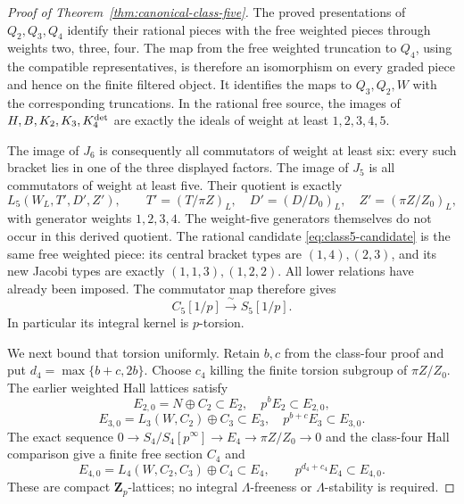 \begin{proof}[Proof of Theorem~\ref{thm:canonical-class-five}]
The proved presentations of $Q_2,Q_3,Q_4$ identify
their rational pieces with the free weighted pieces
through weights two, three, four. The map from the
free weighted truncation to $Q_4$, using the compatible
representatives, is therefore an isomorphism on every
graded piece and hence on the finite filtered object.
It identifies the maps to $Q_3,Q_2,W$ with the
corresponding truncations. In the rational free source,
the images of $H,B,K_2,K_3,K_4^{\rm det}$ are exactly
the ideals of weight at least $1,2,3,4,5$.

The image of $J_6$ is consequently all commutators of
weight at least six: every such bracket lies in one
of the three displayed factors. The image of $J_5$
is all commutators of weight at least five. Their
quotient is exactly
\[
 L_5(W_L,T',D',Z'),\qquad
 T'=(T/\pi Z)_L,\quad D'=(D/D_0)_L,\quad
 Z'=(\pi Z/Z_0)_L,
\]
with generator weights $1,2,3,4$.
The weight-five generators themselves do not occur
in this derived quotient. The rational candidate
\eqref{eq:class5-candidate} is the same free weighted
piece: its central bracket types are $(1,4),(2,3)$,
and its new Jacobi types are exactly $(1,1,3),(1,2,2)$.
All lower relations have already been imposed.
The commutator map therefore gives
\begin{equation}\label{eq:class5-rational-source}
              C_5[1/p]\xrightarrow{\ \sim\ }S_5[1/p].
\end{equation}
In particular its integral kernel is $p$-torsion.

We next bound that torsion uniformly. Retain $b,c$
from the class-four proof and put
$d_4=\max\{b+c,2b\}$. Choose $c_4$ killing the finite
torsion subgroup of $\pi Z/Z_0$. The earlier weighted
Hall lattices satisfy
\[
 E_{2,0}=N\oplus C_2\subset E_2,\quad p^bE_2\subset E_{2,0},
\]
\[
 E_{3,0}=L_3(W,C_2)\oplus C_3\subset E_3,
                      \quad p^{b+c}E_3\subset E_{3,0}.
\]
The exact sequence
$0\to S_4/S_4[p^\infty]\to E_4\to\pi Z/Z_0\to0$
and the class-four Hall comparison give a finite
free section $C_4$ and
\[
 E_{4,0}=L_4(W,C_2,C_3)\oplus C_4\subset E_4,
                 \qquad p^{d_4+c_4}E_4\subset E_{4,0}.
\]
These are compact $\mathbf Z_p$-lattices; no integral
$\Lambda$-freeness or $\Lambda$-stability is required.


\end{proof}
